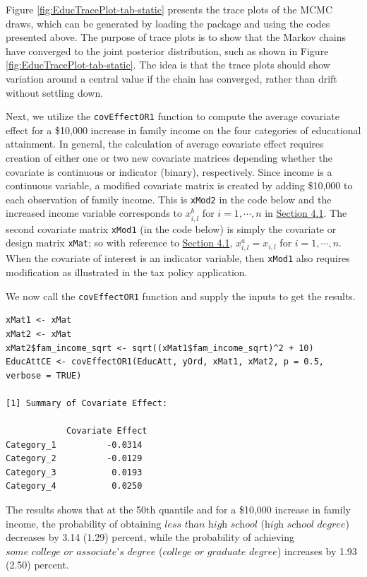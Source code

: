 Figure \ref{fig:EducTracePlot-tab-static} presents the trace plots of the MCMC draws, which can be generated by loading the  package and using the codes presented above. The purpose of trace plots is to show that the Markov chains have converged to the joint posterior distribution, such as shown in Figure \ref{fig:EducTracePlot-tab-static}. The idea is that the trace plots should show variation around a central value if the chain has converged, rather than drift without settling down.

Next, we utilize the \texttt{covEffectOR1} function to compute the average covariate effect for a \$10,000 increase in family income on the four categories of educational attainment. In general, the calculation of average covariate effect requires creation of either one or two new covariate matrices depending whether the covariate is continuous or indicator (binary), respectively. Since income is a continuous variable, a modified covariate matrix is created by adding \$10,000 to each observation of family income. This is \texttt{xMod2} in the code below and the increased income variable corresponds to \(x_{i,l}^{b}\) for \(i=1,\cdots,n\) in \protect\hyperlink{subsec:SimDataORI}{Section 4.1}. The second covariate matrix \texttt{xMod1} (in the code below) is simply the covariate or design matrix \texttt{xMat}; so with reference to \protect\hyperlink{subsec:SimDataORI}{Section 4.1}, \(x_{i,l}^{a} = x_{i,l}\) for \(i=1,\cdots,n\). When the covariate of interest is an indicator variable, then \texttt{xMod1} also requires modification as illustrated in the tax policy application.

We now call the \texttt{covEffectOR1} function and supply the inputs to get the results.

\begin{verbatim}
xMat1 <- xMat
xMat2 <- xMat
xMat2$fam_income_sqrt <- sqrt((xMat1$fam_income_sqrt)^2 + 10)
EducAttCE <- covEffectOR1(EducAtt, yOrd, xMat1, xMat2, p = 0.5, verbose = TRUE)

[1] Summary of Covariate Effect:

            Covariate Effect
Category_1          -0.0314
Category_2          -0.0129
Category_3           0.0193
Category_4           0.0250
\end{verbatim}

The results shows that at the 50th quantile and for a \$10,000 increase in family income, the probability of obtaining \(\textit{less than high school}\) (\(\textit{high school degree}\)) decreases by 3.14 (1.29) percent, while the probability of achieving \(\textit{some college or associate's degree}\) (\(\textit{college or graduate degree}\)) increases by 1.93 (2.50) percent.

